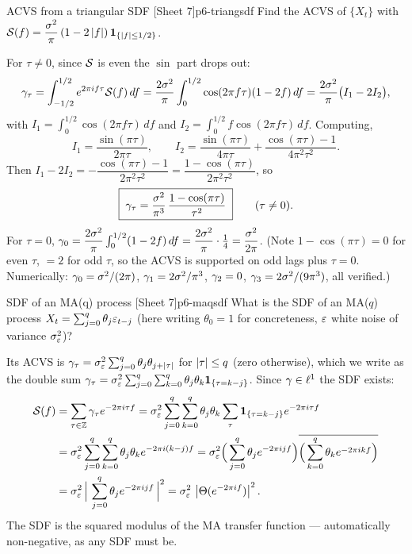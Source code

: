 \begin{exercise}{ACVS from a triangular SDF \quad\textnormal{[Sheet 7]}}{p6-triangsdf}
Find the ACVS of $\{X_t\}$ with
$\mathcal{S}(f)=\dfrac{\sigma^2}{\pi}\,(1-2\left\lvert f \right\rvert)\,\mathbf{1}_{\{\left\lvert f \right\rvert\le 1/2\}}$.
\end{exercise}
\begin{solution}
For $\tau\ne0$, since $\mathcal{S}$ is even the $\sin$ part drops out:
\[
\gamma_\tau=\int_{-1/2}^{1/2} e^{2\pi i f\tau}\mathcal{S}(f)\,df
=\frac{2\sigma^2}{\pi}\int_{0}^{1/2}\cos(2\pi f\tau)(1-2f)\,df
=\frac{2\sigma^2}{\pi}\big(I_1-2I_2\big),
\]
with $I_1=\int_0^{1/2}\cos(2\pi f\tau)\,df$ and
$I_2=\int_0^{1/2} f\cos(2\pi f\tau)\,df$. Computing,
\[
I_1=\frac{\sin(\pi\tau)}{2\pi\tau},\qquad
I_2=\frac{\sin(\pi\tau)}{4\pi\tau}+\frac{\cos(\pi\tau)-1}{4\pi^2\tau^2}.
\]
Then $I_1-2I_2=-\dfrac{\cos(\pi\tau)-1}{2\pi^2\tau^2}
=\dfrac{1-\cos(\pi\tau)}{2\pi^2\tau^2}$, so
\[
\boxed{\;\gamma_\tau=\frac{\sigma^2}{\pi^3}\,\frac{1-\cos(\pi\tau)}{\tau^2}\;}
\qquad(\tau\ne0).
\]
For $\tau=0$, $\gamma_0=\dfrac{2\sigma^2}{\pi}\int_0^{1/2}(1-2f)\,df
=\dfrac{2\sigma^2}{\pi}\cdot\tfrac14=\dfrac{\sigma^2}{2\pi}$. (Note
$1-\cos(\pi\tau)=0$ for even $\tau$, $=2$ for odd $\tau$, so the ACVS is
supported on odd lags plus $\tau=0$. Numerically: $\gamma_0=\sigma^2/(2\pi)$,
$\gamma_1=2\sigma^2/\pi^3$, $\gamma_2=0$, $\gamma_3=2\sigma^2/(9\pi^3)$, all
verified.)
\end{solution}

\begin{exercise}{SDF of an MA(q) process \quad\textnormal{[Sheet 7]}}{p6-maqsdf}
What is the SDF of an MA($q$) process
$X_t=\sum_{j=0}^{q}\theta_j\varepsilon_{t-j}$ (here writing $\theta_0=1$ for
concreteness, $\varepsilon$ white noise of variance $\sigma_\varepsilon^2$)?
\end{exercise}
\begin{solution}
Its ACVS is $\gamma_\tau=\sigma_\varepsilon^2\sum_{j=0}^{q}\theta_j\theta_{j+\left\lvert \tau \right\rvert}$
for $\left\lvert \tau \right\rvert\le q$ (zero otherwise), which we write as the double sum
$\gamma_\tau=\sigma_\varepsilon^2\sum_{j=0}^{q}\sum_{k=0}^{q}
\theta_j\theta_k\mathbf{1}_{\{\tau=k-j\}}$. Since $\gamma\in\ell^1$ the SDF exists:
\[
\begin{aligned}
\mathcal{S}(f)&=\sum_{\tau\in\mathbb{Z}}\gamma_\tau e^{-2\pi i\tau f}
       =\sigma_\varepsilon^2\sum_{j=0}^{q}\sum_{k=0}^{q}\theta_j\theta_k
        \sum_{\tau}\mathbf{1}_{\{\tau=k-j\}}e^{-2\pi i\tau f}\\
       &=\sigma_\varepsilon^2\sum_{j=0}^{q}\sum_{k=0}^{q}\theta_j\theta_k
        e^{-2\pi i(k-j)f}
       =\sigma_\varepsilon^2\Big(\sum_{j=0}^{q}\theta_j e^{-2\pi i j f}\Big)
        \overline{\Big(\sum_{k=0}^{q}\theta_k e^{-2\pi i k f}\Big)}\\
       &=\sigma_\varepsilon^2\,\Big|\,\sum_{j=0}^{q}\theta_j e^{-2\pi i j f}\,\Big|^2
        =\sigma_\varepsilon^2\,\left\lvert \Theta(e^{-2\pi i f}) \right\rvert^2 .
\end{aligned}
\]
The SDF is the squared modulus of the MA transfer function --- automatically
non-negative, as any SDF must be.
\end{solution}

